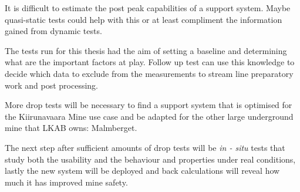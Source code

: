 It is difficult to estimate the post peak capabilities of a support system. Maybe quasi-static tests could help with this or at least compliment the information gained from dynamic tests.



The tests run for this thesis had the aim of setting a baseline and determining what are the important factors at play. Follow up test can use this knowledge to decide which data to exclude from the measurements to stream line preparatory work and post processing. 






More drop tests will be necessary to find a support system that is optimised for the Kiirunavaara Mine use case and be adapted for the other large underground mine that LKAB owns: Malmberget.

The next step after sufficient amounts of drop tests will be \textit{in - situ} tests that study both the usability and the behaviour and properties under real conditions, lastly the new system will be deployed and back calculations will reveal how much it has improved mine safety. 
